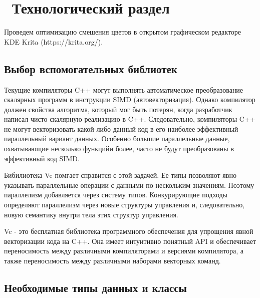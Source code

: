 \chapter{ Технологический раздел}
\label{cha:design}

Проведем оптимизацию смешения цветов в открытом графическом редакторе KDE Krita (https://krita.org/). 


\section{Выбор вспомогательных библиотек}
Текущие компиляторы C++ могут выполнять автоматическое преобразование скалярных программ в инструкции SIMD (автовекторизация). Однако компилятор должен свойства алгоритма, который мог быть потерян, когда разработчик написал чисто скалярную реализацию в C++. Следовательно, компиляторы C++ не могут векторизовать какой-либо данный код в его наиболее эффективный параллельный вариант данных. Особенно большие параллельные данные, охватывающие несколько функцийи более, часто не будут преобразованы в эффективный код SIMD.

Бибилиотека Vc помгает справится с этой задачей. Ее типы позволяют явно указывать параллельные операции с данными по нескольким значениям. Поэтому параллелизм добавляется через систему типов. Конкурирующие подходы определяют параллелизм через новые структуры управления и, следовательно, новую семантику внутри тела этих структур управления.

Vc - это бесплатная библиотека программного обеспечения для упрощения явной векторизации кода на C++. Она имеет интуитивно понятный API и обеспечивает переносимость между различными компиляторами и версиями компилятора, а также переносимость между различными наборами векторных команд. 
\cite{bib8}

\newpage
\section{Необходимые типы данных и классы}


